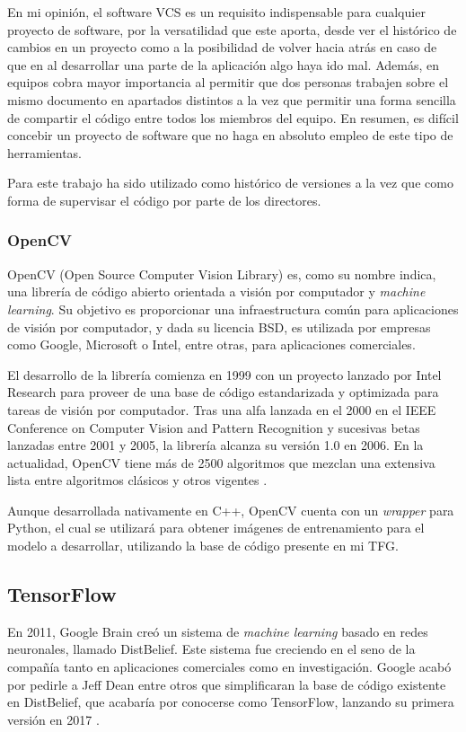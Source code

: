 En mi opinión, el software VCS es un requisito indispensable para cualquier proyecto de software, por la versatilidad que este aporta, desde ver el histórico de cambios en un proyecto como a la posibilidad de volver hacia atrás en caso de que en al desarrollar una parte de la aplicación algo haya ido mal. Además, en equipos cobra mayor importancia al permitir que dos personas trabajen sobre el mismo documento en apartados distintos a la vez que permitir una forma sencilla de compartir el código entre todos los miembros del equipo. En resumen, es difícil concebir un proyecto de software que no haga en absoluto empleo de este tipo de herramientas.

Para este trabajo ha sido utilizado como histórico de versiones a la vez que como forma de supervisar el código por parte de los directores.

\subsubsection*{OpenCV}

OpenCV (Open Source Computer Vision Library) es, como su nombre indica, una librería de código abierto orientada a visión por computador y \textit{machine learning}. Su objetivo es proporcionar una infraestructura común para aplicaciones de visión por computador, y dada su licencia BSD, es utilizada por empresas como Google, Microsoft o Intel, entre otras, para aplicaciones comerciales.

El desarrollo de la librería comienza en 1999 con un proyecto lanzado por Intel Research para proveer de una base de código estandarizada y optimizada para tareas de visión por computador. Tras una alfa lanzada en el 2000 en el IEEE Conference on Computer Vision and Pattern Recognition y sucesivas betas lanzadas entre 2001 y 2005, la librería alcanza su versión 1.0 en 2006. En la actualidad, OpenCV tiene más de 2500 algoritmos que mezclan una extensiva lista entre algoritmos clásicos y otros vigentes \cite{opencv}.

Aunque desarrollada nativamente en C++, OpenCV cuenta con un \textit{wrapper} para Python, el cual se utilizará para obtener imágenes de entrenamiento para el modelo a desarrollar, utilizando la base de código presente en mi TFG.

\subsection*{TensorFlow}

En 2011, Google Brain creó un sistema de \textit{machine learning} basado en redes neuronales, llamado DistBelief. Este sistema fue creciendo en el seno de la compañía tanto en aplicaciones comerciales como en investigación. Google acabó por pedirle a Jeff Dean entre otros que simplificaran la base de código existente en DistBelief, que acabaría por conocerse como TensorFlow, lanzando su primera versión en 2017 \cite{TensorFlow2015-whitepaper}.

